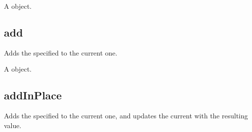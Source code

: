\documentclass[letterpaper,12pt,english,openany,oneside]{sphinxmanual}
\begin{document}
\label{\detokenize{JS_3D_API:syntax-128}}

\begin{sphinxVerbatim}[commandchars=\\\{\}]
   
\end{sphinxVerbatim}
\label{\detokenize{JS_3D_API:parameters-90}}

\label{\detokenize{JS_3D_API:section-128}}\label{\detokenize{JS_3D_API:returns-129}}

A  object.


\subsection{add}
\label{\detokenize{JS_3D_API:add}}
Adds the specified  to the current one.

\label{\detokenize{JS_3D_API:syntax-129}}

\begin{sphinxVerbatim}[commandchars=\\\{\}]
\end{sphinxVerbatim}
\label{\detokenize{JS_3D_API:parameters-91}}

\label{\detokenize{JS_3D_API:section-129}}\label{\detokenize{JS_3D_API:returns-130}}

A  object.


\subsection{addInPlace}
\label{\detokenize{JS_3D_API:addinplace}}
Adds the specified  to the current one, and updates the current  with the resulting value.

\label{\detokenize{JS_3D_API:syntax-130}}

\begin{sphinxVerbatim}[commandchars=\\\{\}]
\end{sphinxVerbatim}
\label{\detokenize{JS_3D_API:parameters-92}}
\end{document}
